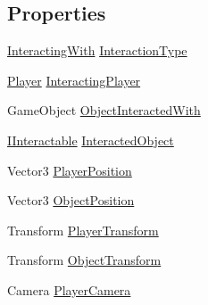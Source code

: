 \subsection*{Properties}
\begin{DoxyCompactItemize}
\item 
\mbox{\hyperlink{class_player_interaction_event_args_a5ee5b290c0a1c78cd0496cad571933d2}{Interacting\+With}} \mbox{\hyperlink{class_player_interaction_event_args_a86883bf68369007a3dc968a90f4c2138}{Interaction\+Type}}
\item 
\mbox{\hyperlink{class_player}{Player}} \mbox{\hyperlink{class_player_interaction_event_args_a6e4d98fdc7ecd9286e014ec6c289055d}{Interacting\+Player}}
\item 
Game\+Object \mbox{\hyperlink{class_player_interaction_event_args_aed3b17be64843abba84c9eed7309be4e}{Object\+Interacted\+With}}
\item 
\mbox{\hyperlink{interface_i_interactable}{I\+Interactable}} \mbox{\hyperlink{class_player_interaction_event_args_ae88bd017816f3fd0d3e2f6f88bbf5c74}{Interacted\+Object}}
\item 
Vector3 \mbox{\hyperlink{class_player_interaction_event_args_ad617d63ef8fe45afe5d4792e7055a2fb}{Player\+Position}}
\item 
Vector3 \mbox{\hyperlink{class_player_interaction_event_args_a610706ef98e54ba59ce5012a3506e3a3}{Object\+Position}}
\item 
Transform \mbox{\hyperlink{class_player_interaction_event_args_a0e71620f6280954cb8307bb10f519763}{Player\+Transform}}
\item 
Transform \mbox{\hyperlink{class_player_interaction_event_args_a85b1b1e10b2e9e3816c8c4efc0b00546}{Object\+Transform}}
\item 
Camera \mbox{\hyperlink{class_player_interaction_event_args_ad0f36344e3ceeca3f286ebbff8414d3e}{Player\+Camera}}
\end{DoxyCompactItemize}


